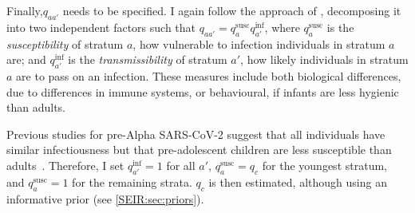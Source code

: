 \documentclass[thesis.tex]{subfiles}
\begin{document}

Finally,$q_{aa'}$ needs to be specified.
I again follow the approach of \textcite{birrellRealtime}, decomposing it into two independent factors such that $q_{aa'} = q^\text{susc}_{a} q^\text{inf}_{a'}$, where $q^\text{susc}_a$ is the \emph{susceptibility} of stratum $a$, \ie how vulnerable to infection individuals in stratum $a$ are; and $q^\text{inf}_{a'}$ is the \emph{transmissibility} of stratum $a'$, \ie how likely individuals in stratum $a$ are to pass on an infection.
These measures include both biological differences, \eg due to differences in immune systems, or behavioural, \eg if infants are less hygienic than adults.


Previous studies for pre-Alpha SARS-CoV-2 suggest that all individuals have similar infectiousness but that pre-adolescent children are less susceptible than adults~\autocites{chenRole}{vinerTransmission}.
Therefore, I set $q^\text{inf}_{a'} = 1$ for all $a'$, $q^\text{susc}_{a} = q_c$ for the youngest stratum, and $q^\text{susc}_{a} = 1$ for the remaining strata.
$q_c$ is then estimated, although using an informative prior (see \cref{SEIR:sec:priors}).
\end{document}
